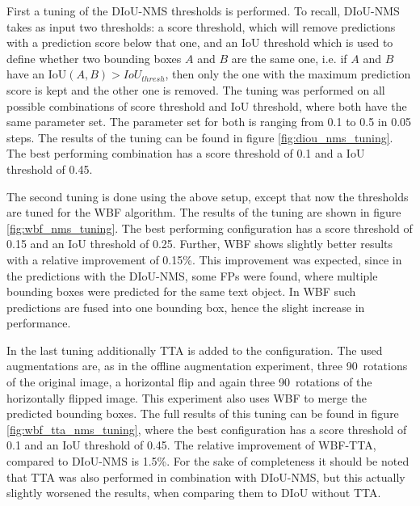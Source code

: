 First a tuning of the \ac{DIoU}-\ac{NMS} thresholds is performed.
To recall, \ac{DIoU}-\ac{NMS} takes as input two thresholds: a score threshold, which will remove predictions with a prediction score below that one, and an \ac{IoU} threshold which is used to define whether two bounding boxes $A$ and $B$ are the same one, i.e. if $A$ and $B$ have an $\text{IoU}(A, B) > IoU_{thresh}$, then only the one with the maximum prediction score is kept and the other one is removed.
The tuning was performed on all possible combinations of score threshold and \ac{IoU} threshold, where both have the same parameter set.
The parameter set for both is ranging from 0.1 to 0.5 in 0.05 steps.
The results of the tuning can be found in figure \ref{fig:diou_nms_tuning}.
The best performing combination has a score threshold of 0.1 and a \ac{IoU} threshold of 0.45.


The second tuning is done using the above setup, except that now the thresholds are tuned for the \ac{WBF} algorithm.
The results of the tuning are shown in figure \ref{fig:wbf_nms_tuning}.
The best performing configuration has a score threshold of 0.15 and an \ac{IoU} threshold of 0.25.
Further, \ac{WBF} shows slightly better results with a relative improvement of 0.15\%.
This improvement was expected, since in the predictions with the DIoU-NMS, some \acp{FP} were found, where multiple bounding boxes were predicted for the same text object.
In \ac{WBF} such predictions are fused into one bounding box, hence the slight increase in performance.


In the last tuning additionally \ac{TTA} is added to the configuration.
The used augmentations are, as in the offline augmentation experiment, three 90\textdegree\ rotations of the original image, a horizontal flip and again three 90\textdegree\ rotations of the horizontally flipped image.
This experiment also uses \ac{WBF} to merge the predicted bounding boxes.
The full results of this tuning can be found in figure \ref{fig:wbf_tta_nms_tuning}, where the best configuration has a score threshold of 0.1 and an \ac{IoU} threshold of 0.45.
The relative improvement of \ac{WBF}-\ac{TTA}, compared to \ac{DIoU}-\ac{NMS} is 1.5\%.
For the sake of completeness it should be noted that \ac{TTA} was also performed in combination with \ac{DIoU}-\ac{NMS}, but this actually slightly worsened the results, when comparing them to \ac{DIoU} without \ac{TTA}.



